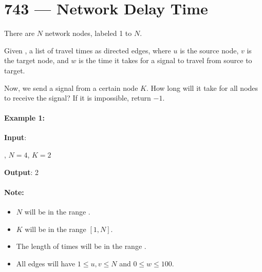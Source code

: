 \section{743 --- Network Delay Time}
There are $N$ network nodes, labeled 1 to $N$.

Given , a list of travel times as directed edges, where $u$ is the source node, $v$ is the target node, and $w$ is the time it takes for a signal to travel from source to target.

Now, we send a signal from a certain node $K$. How long will it take for all nodes to receive the signal? If it is impossible, return $-1$.

\paragraph{Example 1:}

\begin{flushleft}

\begin{figure}[H]
\end{figure}

\textbf{Input}: 

, $N = 4$, $K = 2$

\textbf{Output}: 2
\end{flushleft}
 

\paragraph{Note:}

\begin{itemize}
\item $N$ will be in the range \fcj{[1, 100]}.
\item $K$ will be in the range $[1, N]$.
\item The length of times will be in the range \fcj{[1, 6000]}.
\item All edges  will have $1 \leq u, v \leq N$ and $ 0 \leq w \leq 100$.
\end{itemize}


